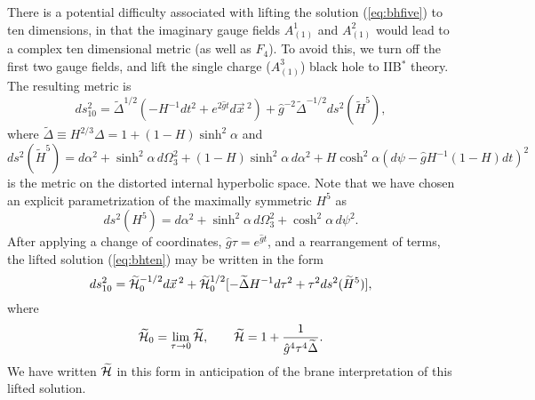 \documentclass[a4paper,12pt]{article}
\newcommand{\fft}[2]{{\frac{#1}{#2}}}
\begin{document}
There is a potential difficulty associated with lifting the solution
(\ref{eq:bhfive}) to ten dimensions, in that the imaginary gauge fields
$A^1_{(1)}$
and $A^2_{(1)}$ would lead to a complex ten dimensional metric (as well as
$F_{4}$).  To avoid this, we turn off the first two gauge fields, and lift
the single charge ($A^3_{(1)}$) black hole to IIB$^*$ theory.  The
resulting metric is
%
\begin{equation}
ds_{10}^2 = \widetilde\Delta^{1/2}(-H^{-1}dt^2+e^{2\hat gt}
d\vec x\,^2)+\hat g^{-2}\widetilde\Delta^{-1/2}ds^2(\widetilde H^5),
\label{eq:bhten}
\end{equation}
%
where $\widetilde\Delta\equiv H^{2/3}\Delta=1+(1-H)\sinh^2\alpha$ and
%
\begin{equation}
ds^2(\widetilde H^5)=d\alpha^2+\sinh^2\alpha\,d\Omega_3^2
+(1-H)\sinh^2\alpha\,d\alpha^2+H\cosh^2\alpha(d\psi-\hat gH^{-1}(1-H)dt)^2
\end{equation}
%
is the metric on the distorted internal hyperbolic space.  Note that we have
chosen an explicit parametrization of the maximally symmetric $H^5$ as
%
\begin{equation}
ds^2(H^5)=d\alpha^2+\sinh^2\alpha\,d\Omega_3^2+\cosh^2\alpha\,d\psi^2.
\end{equation}
%
After applying a change of coordinates, $\hat g\tau=e^{\hat gt}$, and a
rearrangement of terms, the lifted solution (\ref{eq:bhten}) may be
written in the form
%
\begin{equation}
ds_{10}^2 = \widetilde{\cal H}_0^{-1/2}d\vec x\,^2
+\widetilde{\cal H}_0^{1/2}[-\widetilde\Delta
H^{-1}d\tau^2+\tau^2ds^2(\widetilde H^5)],
\label{eq:bhten2}
\end{equation}
%
where
%
\begin{equation}
\widetilde{\cal H}_0=\lim_{\tau\to0}\widetilde{\cal H},\qquad
\widetilde{\cal H}=1+\fft1{\hat g^4\tau^4\widetilde\Delta}.
\end{equation}
%
We have written $\widetilde{\cal H}$ in this form in anticipation of the
brane interpretation of this lifted solution.
\end{document}
